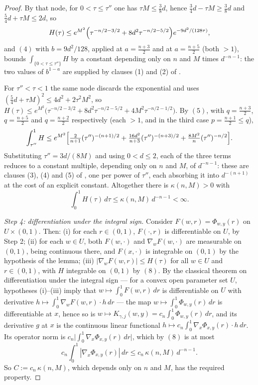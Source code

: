 \begin{proof}
By that node, for $0 < \tau \leq \tau''$ one has $\tau M \leq \tfrac38 d$, hence
$\tfrac34 d - \tau M \geq \tfrac38 d$ and $\tfrac54 d + \tau M \leq 2d$, so
\[
  H(\tau) \leq e^{M^2}\Bigl(\tau^{-n/2-3/2} + 8d^2\tau^{-n/2-5/2}\Bigr)
    e^{-9d^2/(128\tau)} ,
\]
and $(4)$ with $b = 9d^2/128$, applied at $a = \tfrac{n+3}{2}$ and at
$a = \tfrac{n+5}{2}$ (both $>1$), bounds $\int_{\{0<\tau\leq\tau''\}}H$ by a
constant depending only on $n$ and $M$ times $d^{-n-1}$: the two values of
$b^{1-a}$ are supplied by clauses (1) and (2) of
.

For $\tau'' < \tau < 1$ the same node discards the exponential and uses
$(\tfrac54 d+\tau M)^2 \leq 4d^2 + 2\tau^2M^2$, so
$H(\tau) \leq e^{M^2}\bigl(\tau^{-n/2-3/2} + 8d^2\tau^{-n/2-5/2}
 + 4M^2\tau^{-n/2-1/2}\bigr)$.  By $(5)$, with $q = \tfrac{n+3}{2}$,
$q = \tfrac{n+5}{2}$ and $q = \tfrac{n+2}{2}$ respectively (each $>1$, and in the
third case $p = \tfrac{n+1}{2} \leq q$),
\[
  \int_{\tau''}^1 H
    \leq e^{M^2}\Bigl[\tfrac{2}{n+1}(\tau'')^{-(n+1)/2}
      + \tfrac{16d^2}{n+3}(\tau'')^{-(n+3)/2}
      + \tfrac{8M^2}{n}(\tau'')^{-n/2}\Bigr] .
\]
Substituting $\tau'' = 3d/(8M)$ and using $0 < d \leq 2$, each of the three terms
reduces to a constant multiple, depending only on $n$ and $M$, of $d^{-n-1}$: these
are clauses (3), (4) and (5) of , one per
power of $\tau''$, each absorbing it into $d^{-(n+1)}$ at the cost of an explicit
constant.
Altogether there is $\kappa(n,M) > 0$ with
\begin{equation*}
  \int_0^1 H(\tau)\,d\tau \leq \kappa(n,M)\,d^{-n-1} < \infty . \tag{8}
\end{equation*}

\emph{Step 4: differentiation under the integral sign.}
Consider $F(w,r) = \Phi_{w,y}(r)$ on $U\times(0,1)$.  Then: (i) for each
$r \in (0,1)$, $F(\cdot,r)$ is differentiable on $U$, by Step 2; (ii) for each
$w \in U$, both $F(w,\cdot)$ and $\nabla_wF(w,\cdot)$ are measurable on $(0,1)$,
being continuous there, and $F(x,\cdot)$ is integrable on $(0,1)$ by the
hypothesis of the lemma; (iii) $|\nabla_wF(w,r)| \leq H(\tau)$ for all $w \in U$
and $r \in (0,1)$, with $H$ integrable on $(0,1)$ by $(8)$.  By the classical
theorem on differentiation under the integral sign --- for a convex open
parameter set $U$, hypotheses (i)--(iii) imply that
$w \mapsto \int_0^1F(w,r)\,dr$ is differentiable on $U$ with derivative
$h \mapsto \int_0^1\nabla_wF(w,r)\cdot h\,dr$ --- the map
$w \mapsto \int_0^1\Phi_{w,y}(r)\,dr$ is differentiable at $x$, hence so is
$w \mapsto K_{\gamma,j}(w,y) = c_n\int_0^1\Phi_{w,y}(r)\,dr$, and its derivative
$g$ at $x$ is the continuous linear functional
$h \mapsto c_n\int_0^1\nabla_x\Phi_{x,y}(r)\cdot h\,dr$.  Its operator norm is
$c_n\bigl|\int_0^1\nabla_x\Phi_{x,y}(r)\,dr\bigr|$, which by $(8)$ is at most
\[
  c_n\int_0^1|\nabla_x\Phi_{x,y}(r)|\,dr \leq c_n\,\kappa(n,M)\,d^{-n-1} .
\]
So $C := c_n\,\kappa(n,M)$, which depends only on $n$ and $M$, has the required
property.
\end{proof}
